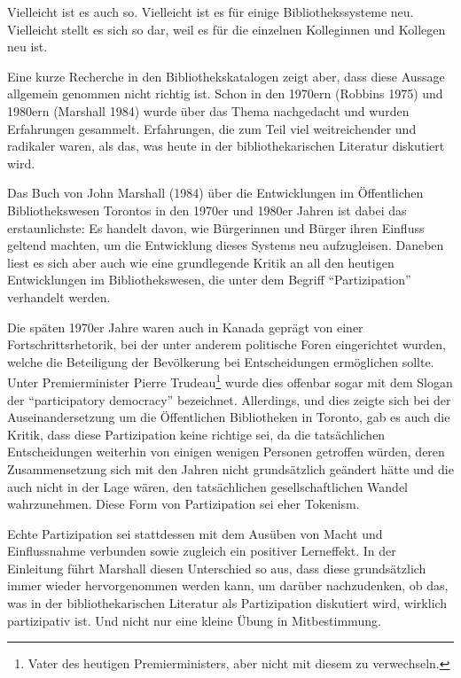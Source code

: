 \documentclass[a4paper,
fontsize=11pt,
oneside,
numbers=noperiodatend,
parskip=half-,
bibliography=totoc,
final
]{scrartcl}
\begin{document}
Vielleicht ist es auch so. Vielleicht ist es für einige
Bibliothekssysteme neu. Vielleicht stellt es sich so dar, weil es für
die einzelnen Kolleginnen und Kollegen neu ist.

Eine kurze Recherche in den Bibliothekskatalogen zeigt aber, dass diese
Aussage allgemein genommen nicht richtig ist. Schon in den 1970ern
(Robbins 1975) und 1980ern (Marshall 1984) wurde über das Thema
nachgedacht und wurden Erfahrungen gesammelt. Erfahrungen, die zum Teil
viel weitreichender und radikaler waren, als das, was heute in der
bibliothekarischen Literatur diskutiert wird.

Das Buch von John Marshall (1984) über die Entwicklungen im Öffentlichen
Bibliothekswesen Torontos in den 1970er und 1980er Jahren ist dabei das
erstaunlichste: Es handelt davon, wie Bürgerinnen und Bürger ihren
Einfluss geltend machten, um die Entwicklung dieses Systems neu
aufzugleisen. Daneben liest es sich aber auch wie eine grundlegende
Kritik an all den heutigen Entwicklungen im Bibliothekswesen, die unter
dem Begriff \enquote{Partizipation} verhandelt werden.

Die späten 1970er Jahre waren auch in Kanada geprägt von einer
Fortschrittsrhetorik, bei der unter anderem politische Foren
eingerichtet wurden, welche die Beteiligung der Bevölkerung bei
Entscheidungen ermöglichen sollte. Unter Premierminister Pierre
Trudeau\footnote{Vater des heutigen Premierministers, aber nicht mit
  diesem zu verwechseln.} wurde dies offenbar sogar mit dem Slogan der
\enquote{participatory democracy} bezeichnet. Allerdings, und dies
zeigte sich bei der Auseinandersetzung um die Öffentlichen Bibliotheken
in Toronto, gab es auch die Kritik, dass diese Partizipation keine
richtige sei, da die tatsächlichen Entscheidungen weiterhin von einigen
wenigen Personen getroffen würden, deren Zusammensetzung sich mit den
Jahren nicht grundsätzlich geändert hätte und die auch nicht in der Lage
wären, den tatsächlichen gesellschaftlichen Wandel wahrzunehmen. Diese
Form von Partizipation sei eher Tokenism.

Echte Partizipation sei stattdessen mit dem Ausüben von Macht und
Einflussnahme verbunden sowie zugleich ein positiver Lerneffekt. In der
Einleitung führt Marshall diesen Unterschied so aus, dass diese
grundsätzlich immer wieder hervorgenommen werden kann, um darüber
nachzudenken, ob das, was in der bibliothekarischen Literatur als
Partizipation diskutiert wird, wirklich partizipativ ist. Und nicht nur
eine kleine Übung in Mitbestimmung.
\end{document}
